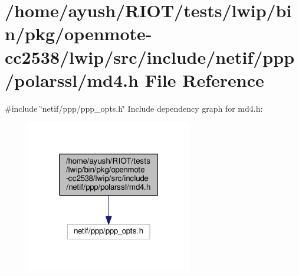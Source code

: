 \hypertarget{openmote-cc2538_2lwip_2src_2include_2netif_2ppp_2polarssl_2md4_8h}{}\section{/home/ayush/\+R\+I\+O\+T/tests/lwip/bin/pkg/openmote-\/cc2538/lwip/src/include/netif/ppp/polarssl/md4.h File Reference}
\label{openmote-cc2538_2lwip_2src_2include_2netif_2ppp_2polarssl_2md4_8h}
{\ttfamily \#include \char`\"{}netif/ppp/ppp\+\_\+opts.\+h\char`\"{}}\newline
Include dependency graph for md4.\+h\+:
\nopagebreak
\begin{figure}[H]
\begin{center}
\leavevmode
\includegraphics[width=205pt]{openmote-cc2538_2lwip_2src_2include_2netif_2ppp_2polarssl_2md4_8h__incl}
\end{center}
\end{figure}
